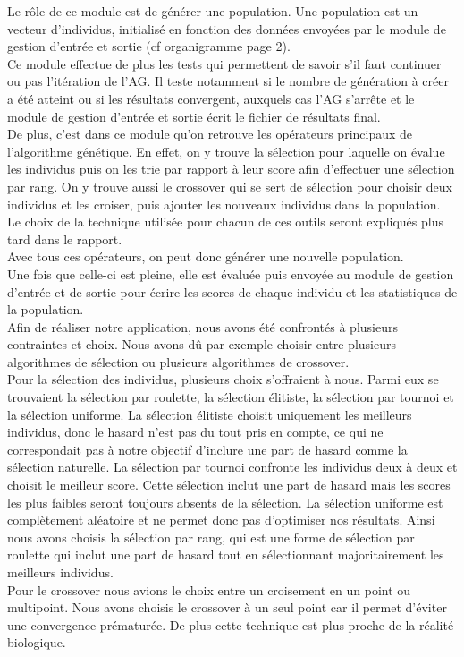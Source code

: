 \documentclass[a4paper,11pt]{article}
\begin{document}
			Le rôle de ce module est de générer une population.
			Une population est un vecteur d’individus, initialisé en fonction des données envoyées par le module de gestion d’entrée et sortie (cf organigramme page 2).\\
			Ce module effectue de plus les tests qui permettent de savoir s’il faut continuer ou pas l’itération de l’AG.
			Il teste notamment si le nombre de génération à créer a été atteint ou si les résultats convergent, auxquels cas l’AG s’arrête et le module de gestion d’entrée et sortie écrit le fichier de résultats final.\\
			De plus, c’est dans ce module qu’on retrouve les opérateurs principaux de l’algorithme génétique.
			En effet, on y trouve la sélection pour laquelle on évalue les individus puis on les trie par rapport à leur score afin d’effectuer une sélection par rang.
			On y trouve aussi le crossover qui se sert de sélection pour choisir deux individus et les croiser, puis ajouter les nouveaux individus dans la population.
			Le choix de la technique utilisée pour chacun de ces outils seront expliqués plus tard dans le rapport.\\
			Avec tous ces opérateurs, on peut donc générer une nouvelle population.\\
			Une fois que celle-ci est pleine, elle est évaluée puis envoyée au module de gestion d’entrée et de sortie pour écrire les scores de chaque individu et les statistiques de la population.\\

			Afin de réaliser notre application, nous avons été confrontés à plusieurs contraintes et choix. Nous avons dû par exemple choisir entre plusieurs algorithmes de sélection ou plusieurs algorithmes de crossover.\\
			Pour la sélection des individus, plusieurs choix s’offraient à nous. Parmi eux se trouvaient la sélection par roulette, la sélection élitiste, la sélection par tournoi et la sélection uniforme.
			La sélection élitiste choisit uniquement les meilleurs individus, donc le hasard n’est pas du tout pris en compte, ce qui ne correspondait pas à notre objectif d’inclure une part de hasard comme la sélection naturelle.
			La sélection par tournoi confronte les individus deux à deux et choisit le meilleur score.
			Cette sélection inclut une part de hasard mais les scores les plus faibles seront toujours absents de la sélection.
			La sélection uniforme est complètement aléatoire et ne permet donc pas d’optimiser nos résultats.
			Ainsi nous avons choisis la sélection par rang, qui est une forme de sélection par roulette qui inclut une part de hasard tout en sélectionnant majoritairement les meilleurs individus.\\
			Pour le crossover nous avions le choix entre un croisement en un point ou multipoint.
			Nous avons choisis le crossover à un seul point car il permet d’éviter une convergence prématurée. De plus cette technique est plus proche de la réalité biologique.
\end{document}
